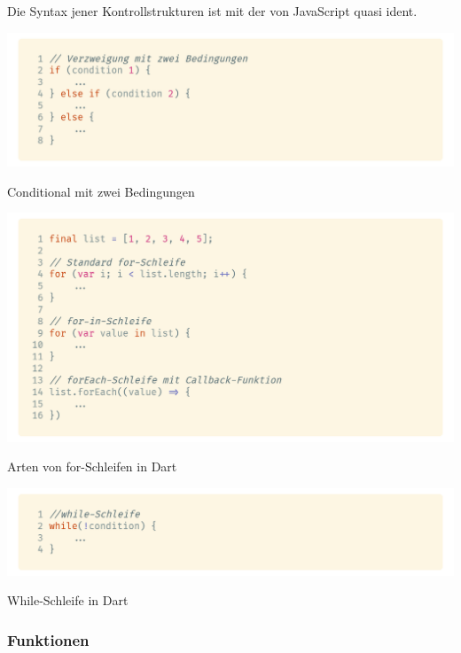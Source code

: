 Die Syntax jener Kontrollstrukturen ist mit der von JavaScript quasi ident.

\begin{code}[h]
    \centering
    \includegraphics[width=1\textwidth]{images/Dart/theory/dartConditional.png}
    \vspace{-25pt}
    \caption{Conditional mit zwei Bedingungen}
\end{code}

\begin{code}[h]
    \centering
    \includegraphics[width=1\textwidth]{images/Dart/theory/dartForLoop.png}
    \vspace{-25pt}
    \caption{Arten von for-Schleifen in Dart}
\end{code}

\begin{code}[h]
    \centering
    \includegraphics[width=1\textwidth]{images/Dart/theory/dartWhileLoops.png}
    \vspace{-25pt}
    \caption{While-Schleife in Dart}
\end{code}

\newpage

\subsubsection{Funktionen}

